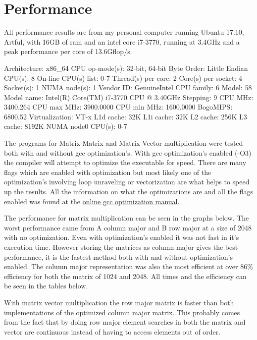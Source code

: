 \documentclass[a4paper]{article}
\begin{document}
\section*{Performance}
All performance results are from my personal computer running Ubuntu 17.10, Artful, with 16GB of ram and an intel core i7-3770, running at 3.4GHz and a peak performance per core of 13.6Gflop/s.

\begin{verbnobox}[\footnotesize]
Architecture:        x86_64
CPU op-mode(s):      32-bit, 64-bit
Byte Order:          Little Endian
CPU(s):              8
On-line CPU(s) list: 0-7
Thread(s) per core:  2
Core(s) per socket:  4
Socket(s):           1
NUMA node(s):        1
Vendor ID:           GenuineIntel
CPU family:          6
Model:               58
Model name:          Intel(R) Core(TM) i7-3770 CPU @ 3.40GHz
Stepping:            9
CPU MHz:             3400.264
CPU max MHz:         3900.0000
CPU min MHz:         1600.0000
BogoMIPS:            6800.52
Virtualization:      VT-x
L1d cache:           32K
L1i cache:           32K
L2 cache:            256K
L3 cache:            8192K
NUMA node0 CPU(s):   0-7
\end{verbnobox}

The programs for Matrix Matrix and Matrix Vector multiplication were tested both with and without gcc optimization's. With gcc optimization's enabled (-O3) the compiler will attempt to optimize the executable for speed. There are many flags which are enabled with optimization but most likely one of the optimization's involving loop unraveling or vectorization are what helps to speed up the results. All the information on what the optimizations are and all the flags enabled was found at the \href{https://gcc.gnu.org/onlinedocs/gcc/Optimize-Options.html}{online gcc optimization manual}.

The performance for matrix multiplication can be seen in the graphs below. The worst performance came from A column major and B row major at a size of 2048 with no optimization. Even with optimization's enabled it was not fast in it's execution time. However storing the matrices as column major gives the best performance, it is the fastest method both with and without optimization's enabled. The column major representation was also the most efficient at over 86\% efficiency for both the matrix of 1024 and 2048. All times and the efficiency can be seen in the tables below.

With matrix vector multiplication the row major matrix is faster than both implementations of the optimized column major matrix. This probably comes from the fact that by doing row major element searches in both the matrix and vector are continuous instead of having to access elements out of order.
\end{document}
